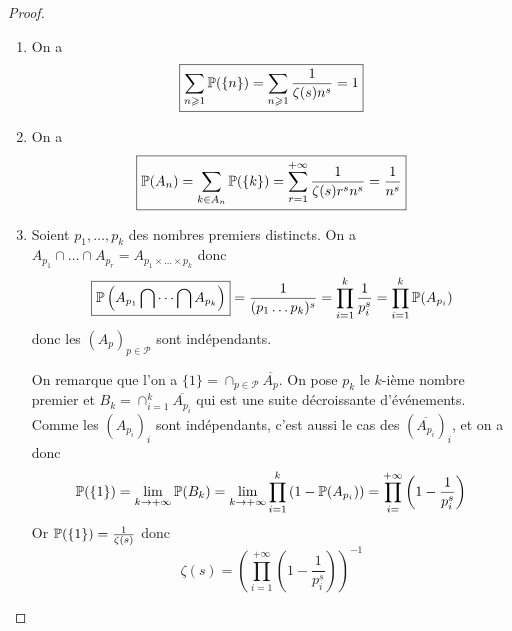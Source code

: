 \begin{proof}
    \phantom{}
    \begin{enumerate}
        \item On a 
        \begin{equation}
            \boxed{\sum_{n\geqslant1}\P(\lbrace n\rbrace)=\sum_{n\geqslant1}\frac{1}{\zeta(s)n^{s}}=1}
        \end{equation}

        \item On a 
        \begin{equation}
            \boxed{\P(A_{n})=\sum_{k\in A_{n}}\P(\lbrace k\rbrace)=\sum_{r=1}^{+\infty}\frac{1}{\zeta(s)r^{s}n^{s}}=\frac{1}{n^{s}}}
        \end{equation}

        \item Soient $p_{1},\dots,p_{k}$ des nombres premiers distincts. On a $A_{p_{1}}\cap\dots\cap A_{p_{r}}=A_{p_{1}\times\dots\times p_{k}}$ donc 
        \begin{equation}
            \boxed{\P\left(A_{p_{1}}\bigcap\dots\bigcap A_{p_{k}}\right)}=\frac{1}{(p_{1}\dots p_{k})^{s}}=\prod_{i=1}^{k}\frac{1}{p_{i}^{s}}=\prod_{i=1}^{k}\P(A_{p_{i}})
        \end{equation}
        donc les $(A_{p})_{p\in\mathcal{P}}$ sont indépendants.

        On remarque que l'on a $\lbrace1\rbrace=\cap_{p\in\mathcal{P}}\overline{A_{p}}$. On pose $p_{k}$ le $k$-ième nombre premier et $B_{k}=\cap_{i=1}^{k}\overline{A_{p_{i}}}$ qui est une suite décroissante d'événements. Comme les $(A_{p_{i}})_{i}$ sont indépendants, c'est aussi le cas des $(\overline{A_{p_{i}}})_{i}$, et on a donc 
        \begin{equation}
            \P(\lbrace1\rbrace)=\lim\limits_{k\to+\infty}\P(B_{k})=\lim\limits_{k\to+\infty}\prod_{i=1}^{k}\left(1-\P(A_{p_{i}})\right)=\prod_{i=}^{+\infty}\left(1-\frac{1}{p_{i}^{s}}\right)
        \end{equation}
        Or $\P(\lbrace1\rbrace)=\frac{1}{\zeta(s)}$ donc 
        \begin{equation}
            \boxed{\zeta(s)=\left(\prod_{i=1}^{+\infty}\left(1-\frac{1}{p_{i}^{s}}\right)\right)^{-1}}
        \end{equation}
    \end{enumerate}
\end{proof}

